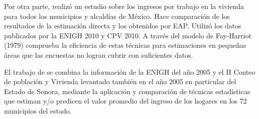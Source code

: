 \documentclass[
  11pt,
  spanish,
  oneside]{book}
\begin{document}
Por otra parte, \citep{Suárez2015} realizó un estudio sobre los ingresos por trabajo en la vivienda para todos los municipios y alcaldías de México. Hace comparación de los resultados de la estimación directa y los obtenidos por EAP. Utilizó los datos publicados por la ENIGH 2010 y CPV 2010. A través del modelo de Fay-Harriot (1979) comprueba la eficiencia de estas técnicas para estimaciones en pequeñas áreas que las encuestas no logran cubrir con suficientes datos.

El trabajo de \citep{Campos2010} se combina la información de la ENIGH del año 2005 y el II Conteo de población y Vivienda levantado también en el año 2005 en particular del Estado de Sonora, mediante la aplicación y comparación de técnicas estadísticas que estiman y/o predicen el valor promedio del ingreso de los hogares en los 72 municipios del estado.

  
\end{document}
